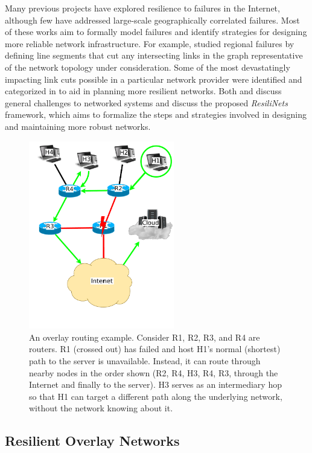 \documentclass[conference]{IEEEtran}
\begin{document}
Many previous projects have explored resilience to failures in the Internet, although few have addressed large-scale geographically correlated failures.
Most of these works aim to formally model failures and identify strategies for designing more reliable network infrastructure.
For example, \cite{geocorrelated} studied regional failures by defining line segments that cut any intersecting links in the graph representative of the network topology under consideration.
Some of the most devastatingly impacting link cuts possible in a particular network provider were identified and categorized in \cite{net_disaster_planning} to aid in planning more resilient networks.
Both \cite{model_analysis} and \cite{resilience_survey} discuss general challenges to networked systems and discuss the proposed \emph{ResiliNets} framework, which aims to formalize the steps and strategies involved in designing and maintaining more robust networks.


\begin{figure}[!t]
\centering
\includegraphics[width=2.5in]{overlay_path.pdf}
\caption{An overlay routing example.  Consider R1, R2, R3, and R4 are routers.  R1 (crossed out) has failed and host H1's normal (shortest) path to the server is unavailable.  Instead, it can route through nearby nodes in the order shown (R2, R4, H3, R4, R3, through the Internet and finally to the server).  H3 serves as an intermediary hop so that H1 can target a different path along the underlying network, without the network knowing about it.}
\label{fig_overlay_path}
\end{figure}

\subsection{Resilient Overlay Networks}
\end{document}
